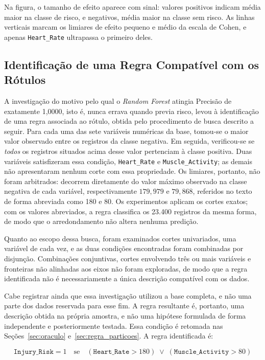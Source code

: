 Na figura, o tamanho de efeito aparece com sinal: valores positivos indicam média maior na classe de risco, e negativos, média maior na classe sem risco. As linhas verticais marcam os limiares de efeito pequeno e médio da escala de Cohen, e apenas \texttt{Heart\_Rate} ultrapassa o primeiro deles.

\subsection{Identificação de uma Regra Compatível com os Rótulos}
\label{sec:regra}
A investigação do motivo pelo qual o \textit{Random Forest} atingia Precisão de exatamente 1{,}0000, isto é, nunca errava quando previa risco, levou à identificação de uma regra associada ao rótulo, obtida pelo procedimento de busca descrito a seguir. Para cada uma das sete variáveis numéricas da base, tomou-se o maior valor observado entre os registros da classe negativa. Em seguida, verificou-se se \textit{todos} os registros situados acima desse valor pertenciam à classe positiva. Duas variáveis satisfizeram essa condição, \texttt{Heart\_Rate} e \texttt{Muscle\_Activity}; as demais não apresentaram nenhum corte com essa propriedade. Os limiares, portanto, não foram arbitrados: decorrem diretamente do valor máximo observado na classe negativa de cada variável, respectivamente $179{,}979$ e $79{,}868$, referidos no texto de forma abreviada como 180 e 80. Os experimentos aplicam os cortes exatos; com os valores abreviados, a regra classifica os 23.400 registros da mesma forma, de modo que o arredondamento não altera nenhuma predição.

Quanto ao escopo dessa busca, foram examinados cortes univariados, uma variável de cada vez, e as duas condições encontradas foram combinadas por disjunção. Combinações conjuntivas, cortes envolvendo três ou mais variáveis e fronteiras não alinhadas aos eixos não foram exploradas, de modo que a regra identificada não é necessariamente a única descrição compatível com os dados.

Cabe registrar ainda que essa investigação utilizou a base completa, e não uma parte dos dados reservada para esse fim. A regra resultante é, portanto, uma descrição obtida na própria amostra, e não uma hipótese formulada de forma independente e posteriormente testada. Essa condição é retomada nas Seções~\ref{sec:oraculo} e~\ref{sec:regra_particoes}. A regra identificada é:

\begin{equation}
\label{eq:regra}
\texttt{Injury\_Risk} = 1 \quad \text{se} \quad (\texttt{Heart\_Rate} > 180) \;\lor\; (\texttt{Muscle\_Activity} > 80)
\end{equation}

